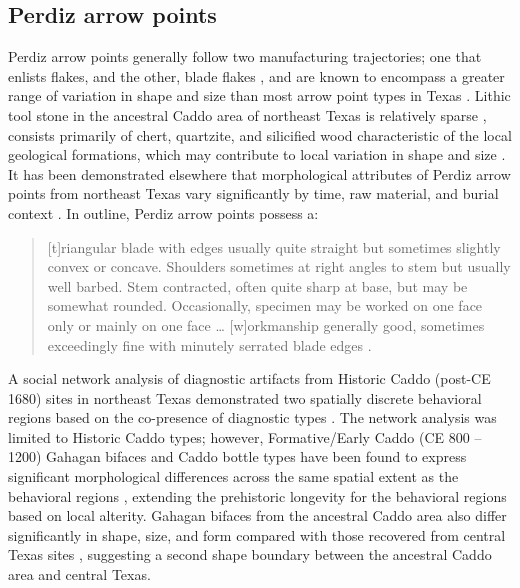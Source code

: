 \documentclass[smallextended]{svjour3}       %
\begin{document}
\hypertarget{perdiz-arrow-points}{%
\subsection{Perdiz arrow points}\label{perdiz-arrow-points}}

Perdiz arrow points generally follow two manufacturing trajectories; one
that enlists flakes, and the other, blade flakes
\cite{RN8999,RN9361,RN9000,RN9364}, and are known to encompass a greater
range of variation in shape and size than most arrow point types in
Texas \cite{RN7795,RN3149}. Lithic tool stone in the ancestral Caddo
area of northeast Texas is relatively sparse \cite[Figure 2]{RN9364},
consists primarily of chert, quartzite, and silicified wood
characteristic of the local geological formations, which may contribute
to local variation in shape and size \cite{RN9364,RN439}. It has been
demonstrated elsewhere that morphological attributes of Perdiz arrow
points from northeast Texas vary significantly by time, raw material,
and burial context \cite{RN9364}. In outline, Perdiz arrow points
possess a:

\begin{quote}
{[}t{]}riangular blade with edges usually quite straight but sometimes
slightly convex or concave. Shoulders sometimes at right angles to stem
but usually well barbed. Stem contracted, often quite sharp at base, but
may be somewhat rounded. Occasionally, specimen may be worked on one
face only or mainly on one face \ldots{} {[}w{]}orkmanship generally
good, sometimes exceedingly fine with minutely serrated blade edges
\cite[504]{RN5769}.
\end{quote}

A social network analysis of diagnostic artifacts from Historic Caddo
(post-CE 1680) sites in northeast Texas demonstrated two spatially
discrete behavioral regions based on the co-presence of diagnostic types
\cite[Figure 12.4]{RN8031}. The network analysis was limited to Historic
Caddo types; however, Formative/Early Caddo (CE 800 -- 1200) Gahagan
bifaces and Caddo bottle types have been found to express significant
morphological differences across the same spatial extent as the
behavioral regions \cite{RN8074,RN7927,RN8370,RN8312}, extending the
prehistoric longevity for the behavioral regions based on local
alterity. Gahagan bifaces from the ancestral Caddo area also differ
significantly in shape, size, and form compared with those recovered
from central Texas sites \cite{RN8322}, suggesting a second shape
boundary between the ancestral Caddo area and central Texas.
\end{document}
